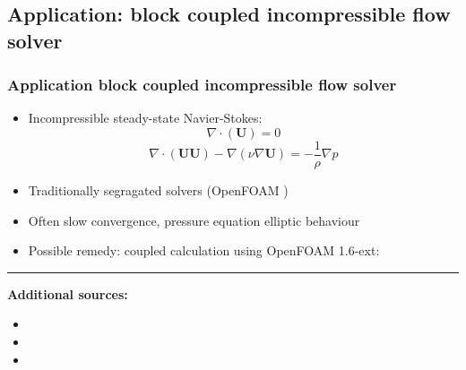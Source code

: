 \documentclass[9pt,handout]{beamer} %
\newcommand{\Ukrj}{\mathbf{U}}
\begin{document}
\subsection{Application: block coupled incompressible flow solver}
\begin{frame}%
\frametitle{Application block coupled incompressible flow solver}
\begin{itemize}\itemsep10pt
    \item Incompressible steady-state Navier-Stokes:
        \begin{equation}
        \nabla\cdot(\Ukrj) = 0 
        \end{equation}
        \begin{equation}
        \label{eq:momentum}
        \nabla\cdot(\Ukrj\Ukrj)-\nabla(\nu\nabla \Ukrj) = -\frac{1}{\rho} \nabla p
        \end{equation}
    \pause
    \item Traditionally segragated solvers (OpenFOAM )
    \pause
    \item Often slow convergence, pressure equation elliptic behaviour %
    \pause
    \item Possible remedy: coupled calculation using OpenFOAM 1.6-ext: 
\end{itemize}
\vfill
\pause
\rule{0.5\textwidth}{0.5pt}\newline
\scriptsize
{\bf Additional sources:}
\begin{itemize}
    \item {}
    \item {}
    \item {}
\end{itemize}
\end{frame}
\end{document}
